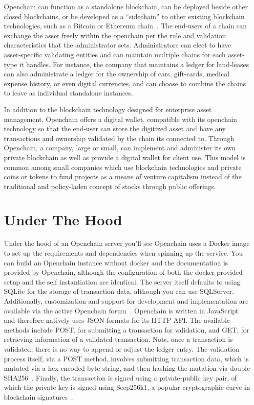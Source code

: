 Openchain can function as a standalone blockchain, can be deployed beside other
closed blockchains, or be developed as a ``sidechain'' to other existing
blockchain technologies, such as a Bitcoin or Ethereum
chain~\cite{OpenchainHome}. The end-users of a chain can exchange the asset
freely within the openchain  per the rule and validation characteristics that
the administrator sets. Administrators can elect to have asset-specific
validating entities and can maintain multiple chains for each asset-type it
handles. For instance, the company that maintains a ledger for land-leases can
also administrate a ledger for the ownership of cars, gift-cards, medical
expense history, or even digital currencies, and can choose to combine the
chains to leave as individual standalone instances.

In addition to the blockchain technology designed for enterprise asset
management, Openchain offers a digital wallet, compatible with its openchain
technology so that the end-user can store the digitized asset and have any
transactions and ownership validated by the chain its connected to. Through
Openchain, a company, large or small, can implement and administer its own
private blockchain as well as provide a digital wallet for client use. This
model is common among small companies which use blockchain technologies and
private coins or tokens to fund projects as a means of venture capitalism
instead of the traditional and policy-laden concept of stocks through public
offerings.

\section{Under The Hood}
Under the hood of an Openchain server you'll see Openchain uses a Docker image
to set up the requirements and dependencies when spinning up the service. You
can build an Openchain instance without docker and the documentation is
provided by Openchain, although the configuration of both the docker-provided
setup and the self instantiation are identical. The server itself defaults to
using SQLite for the storage of transaction data, although you can use
SQLServer. Additionally, customization and support for development and
implementation are available via the active Openchain
forum~\cite{OpenchainForum}. Openchain is written in JavaScript and therefore
natively uses JSON formats for its HTTP API. The available methods include
POST, for submitting a transaction for validation, and GET, for retrieving
information of a validated transaction. Note, once a transaction is validated,
there is no way to append or adjust the ledger entry. The validation process
itself, via a POST method, involves submitting transaction data, which is
mutated via a hex-encoded byte string, and then hashing the mutation via double
SHA256~\cite{SHA256Wiki}. Finally, the transaction is signed using a
private-public key pair, of which the private key is signed using Secp256k1, a
popular cryptographic curve in blockchain signatures~\cite{Secp256k1Wiki}.

